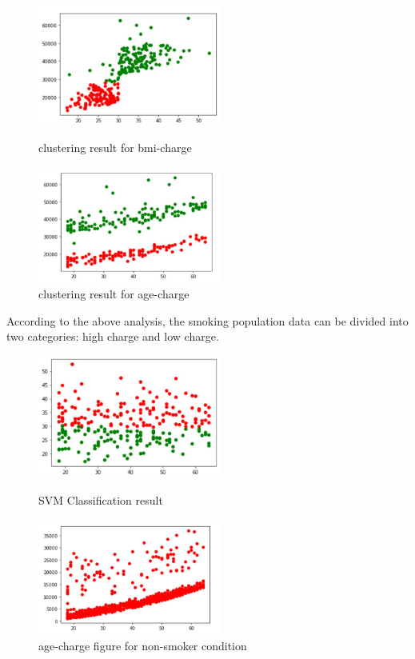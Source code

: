 \documentclass[12pt,a4paper]{article}
\begin{document}
\begin{figure}[H]
\centering
\begin{minipage}[t]{0.48\textwidth}
\centering
\includegraphics[width=6cm]{cluster result for bmi-charge.jpg}
\caption{clustering result for bmi-charge}
\end{minipage}
\begin{minipage}[t]{0.48\textwidth}
\centering
\includegraphics[width=6cm]{clustering result for age-charge.jpg}
\caption{clustering result for age-charge}
\end{minipage}
\end{figure}


According to the above analysis, the smoking population data can be divided into two categories: high charge and low charge. 
\begin{figure}[H]
\centering
\begin{minipage}[t]{0.48\textwidth}
\centering
\includegraphics[width=6cm]{svm.jpg}
\caption{SVM Classification result}
\end{minipage}
\begin{minipage}[t]{0.48\textwidth}
\centering
\includegraphics[width=6cm]{age-chargenonsmoker.jpg}
\caption{age-charge figure for non-smoker condition}
\end{minipage}
\end{figure}
\end{document}
